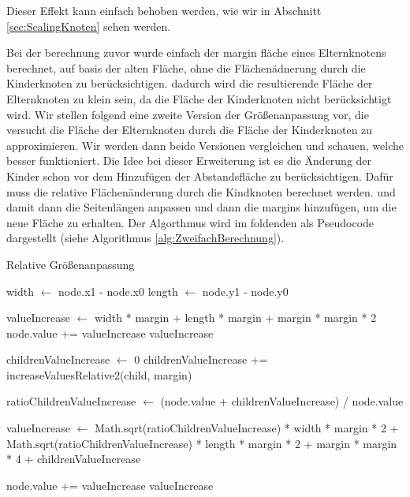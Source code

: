 Dieser Effekt kann einfach behoben werden, wie wir in Abschnitt \ref{sec:ScalingKnoten} sehen werden.

Bei der berechnung zuvor wurde einfach der margin fläche eines Elternknotens berechnet, auf basis der alten Fläche, ohne die Flächenädnerung durch die Kinderknoten zu berücksichtigen. dadurch wird die resultierende Fläche der Elternknoten zu klein sein, da die Fläche der Kinderknoten nicht berücksichtigt wird.
Wir stellen folgend eine zweite Version der Größenanpassung vor, die versucht die Fläche der Elternknoten durch die Fläche der Kinderknoten zu approximieren. Wir werden dann beide Versionen vergleichen und schauen, welche besser funktioniert.
Die Idee bei dieser Erweiterung ist es die Änderung der Kinder schon vor dem Hinzufügen der Abstandsfläche zu berücksichtigen. Dafür muss die relative Flächenänderung durch die Kindknoten berechnet werden. und damit dann die Seitenlängen anpassen und dann die margins hinzufügen, um die neue Fläche zu erhalten.
Der Algorthmus wird im foldenden als Pseudocode dargestellt (siehe Algorithmus \ref{alg:ZweifachBerechnung}). 

\begin{algorithm}[H]
\caption{Relative Größenanpassung}
\label{alg:ZweifachBerechnung}
\begin{algorithmic}[1]
    \State width $\gets$ node.x1 - node.x0
    \State length $\gets$ node.y1 - node.y0

        \State valueIncrease $\gets$ width * margin + length * margin + margin * margin * 2
        \State node.value += valueIncrease
        \State \Return valueIncrease
    \EndIf

    \State childrenValueIncrease $\gets$ 0
            \State childrenValueIncrease += increaseValuesRelative2(child, margin)
        \EndFor
    \EndIf

    \State ratioChildrenValueIncrease $\gets$ (node.value + childrenValueIncrease) / node.value

    \State valueIncrease $\gets$ 
        Math.sqrt(ratioChildrenValueIncrease) * width * margin * 2 +
        Math.sqrt(ratioChildrenValueIncrease) * length * margin * 2 +
    margin * margin * 4 +
        childrenValueIncrease

    \State node.value += valueIncrease
    \State \Return valueIncrease
\EndFunction
\end{algorithmic}
\end{algorithm}

